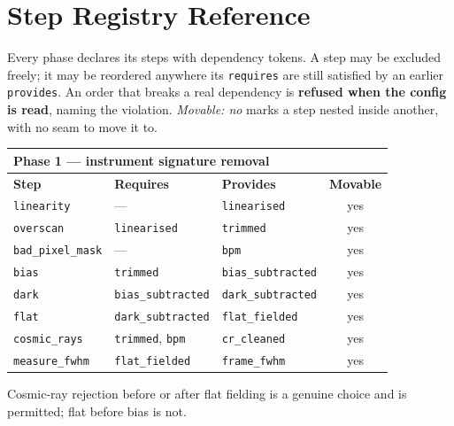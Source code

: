 \documentclass[11pt,a4paper]{article}
\begin{document}
\section{Step Registry Reference}
Every phase declares its steps with dependency tokens. A step may be excluded
freely; it may be reordered anywhere its \texttt{requires} are still satisfied by
an earlier \texttt{provides}. An order that breaks a real dependency is
\textbf{refused when the config is read}, naming the violation. \emph{Movable:
no} marks a step nested inside another, with no seam to move it to.

\begin{center}
\begin{tabularx}{\textwidth}{|l|X|X|c|}
\hline
\multicolumn{4}{|l|}{\textbf{Phase 1 --- instrument signature removal}} \\
\hline
\textbf{Step} & \textbf{Requires} & \textbf{Provides} & \textbf{Movable} \\
\hline
\texttt{linearity} & --- & \texttt{linearised} & yes \\
\hline
\texttt{overscan} & \texttt{linearised} & \texttt{trimmed} & yes \\
\hline
\texttt{bad\_pixel\_mask} & --- & \texttt{bpm} & yes \\
\hline
\texttt{bias} & \texttt{trimmed} & \texttt{bias\_subtracted} & yes \\
\hline
\texttt{dark} & \texttt{bias\_subtracted} & \texttt{dark\_subtracted} & yes \\
\hline
\texttt{flat} & \texttt{dark\_subtracted} & \texttt{flat\_fielded} & yes \\
\hline
\texttt{cosmic\_rays} & \texttt{trimmed}, \texttt{bpm} & \texttt{cr\_cleaned} & yes \\
\hline
\texttt{measure\_fwhm} & \texttt{flat\_fielded} & \texttt{frame\_fwhm} & yes \\
\hline
\end{tabularx}
\end{center}

Cosmic-ray rejection before or after flat fielding is a genuine choice and is
permitted; flat before bias is not.
\end{document}
